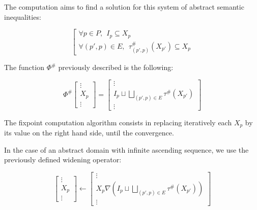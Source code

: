 \documentclass[a4paper,english,titlepage,11pt]{article}
\newcommand*\system[1]{\left[ \begin{array}{lllll}#1 \end{array}\right.}
\begin{document}
The computation aims to find a solution for this system of abstract semantic
inequalities:

$$\system{
\forall p \in P, \ \ I_p \subseteq X_p \\
\forall (p',p) \in E,\ \  \tau^\#_{(p',p)}(X_{p'}) \subseteq X_p
}$$

\begin{figure}[h!]
\centering
{}
\end{figure}

The function $\Phi^\#$ previously described is the following:

$$\Phi^\#\left[ \begin{array}{c}
\vdots \\
X_p \\
\vdots
\end{array} \right] = \left[ \begin{array}{c} 
\vdots \\
I_p \sqcup \displaystyle \bigsqcup_{(p',p) \in E} \tau^\# (X_{p'}) \\
\vdots
\end{array} \right]$$

The fixpoint computation algorithm consists in replacing iteratively each $X_p$ by its value
on the right hand side, until the convergence.

In the case of an abstract domain with infinite ascending sequence, we use the
previously defined widening operator:

$$\left[ \begin{array}{c}
\vdots \\
X_p \\
\vdots
\end{array} \right] \longleftarrow \left[ \begin{array}{c} 
\vdots \\
X_p \nabla \left( I_p \sqcup \displaystyle \bigsqcup_{(p',p) \in E} \tau^\#
(X_{p'}) \right) \\
\vdots
\end{array} \right]$$
\end{document}
